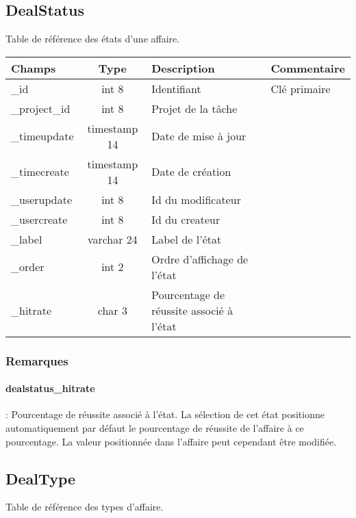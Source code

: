\subsection{DealStatus}
Table de référence des états d'une affaire.\\

\begin{tabular}{|p{3cm}|c|p{5.4cm}|p{2.6cm}|}
\hline
\textbf{Champs} & \textbf{Type} & \textbf{Description} & \textbf{Commentaire} \\
\hline
\_id & int 8 & Identifiant & Clé primaire \\
\hline
\_project\_id & int 8 & Projet de la tâche & \\
\hline
\_timeupdate & timestamp 14 & Date de mise à jour & \\
\hline
\_timecreate & timestamp 14 & Date de création & \\
\hline
\_userupdate & int 8 & Id du modificateur & \\
\hline
\_usercreate & int 8 & Id du createur & \\
\hline
\_label & varchar 24 & Label de l'état & \\
\hline
\_order & int 2 & Ordre d'affichage de l'état & \\
\hline
\_hitrate & char 3 & Pourcentage de réussite associé à l'état & \\
\hline
\end{tabular}

\subsubsection{Remarques}

\paragraph{dealstatus\_hitrate} : Pourcentage de réussite associé à l'état. La sélection de cet état positionne automatiquement par défaut le pourcentage de réussite de l'affaire à ce pourcentage.
La valeur positionnée dans l'affaire peut cependant être modifiée.


\subsection{DealType}
Table de référence des types d'affaire.

